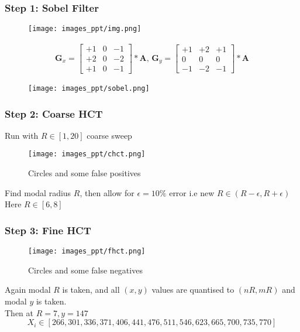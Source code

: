 \documentclass{beamer}
\begin{document}
\begin{frame}\frametitle{Step 1: Sobel Filter}
%
\begin{figure}
    \centering
    \texttt{[image: images\_ppt/img.png]}
\end{figure}
%
\begin{align*}
\mathbf{G}_x =\begin{bmatrix}
+1&0&-1\\+2&0&-2\\+1&0&-1
\end{bmatrix}*\mathbf {A} ,\,
\mathbf{G}_y =\begin{bmatrix}
+1&+2&+1\\0&0&0\\-1&-2&-1
\end{bmatrix}*\mathbf {A}
\end{align*}
%
\begin{figure}
    \centering
    \texttt{[image: images\_ppt/sobel.png]}
\end{figure}
%
\end{frame}

\begin{frame}\frametitle{Step 2: Coarse HCT}

Run with $R\in [1, 20]$ coarse sweep

\begin{figure}
    \centering
    \texttt{[image: images\_ppt/chct.png]}
\caption{Circles and some false positives}
\end{figure}

Find modal radius $R$, then allow for $\epsilon = 10\%$ error i.e new $R\in (R-\epsilon, R+\epsilon)$
\\
Here $R\in [6, 8]$

\end{frame}

\begin{frame}\frametitle{Step 3: Fine HCT}

\begin{figure}
    \centering
    \texttt{[image: images\_ppt/fhct.png]}
    \caption{Circles and some false negatives}
\end{figure}

Again modal $R$ is taken, and all $(x,y)$ values are quantised to $(nR, mR)$ and modal $y$ is taken.
\\
Then at $R=7, y=147$
%
$$
X_i \in [266, 301, 336, 371, 406, 441, 476, 511, 546, 623, 665, 700, 735, 770]
$$
\end{frame}
\end{document}
